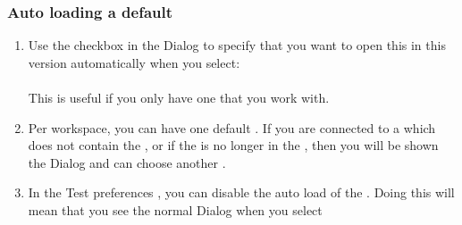 \subsubsection{Auto loading a default \gdproject{}}
\label{TasksAutoLoadProject}
\begin{enumerate}
\item Use the checkbox in the  Dialog to specify that you want to open this \gdproject{} in this version automatically when you select:\\
\\
This is useful if you only have one \gdproject{} that you work with.
\item Per workspace, you can have one default \gdproject{}. If you are connected to a \gddb{} which does not contain the \gdproject{}, or if the \gdproject{} is no longer in the \gddb{}, then you will be shown the  Dialog and can choose another \gdproject{}. 
\item In the Test preferences , you can disable the auto load of the \gdproject{}. Doing this will mean that you see the normal   Dialog when you select\\
 \\
\end{enumerate}


  

